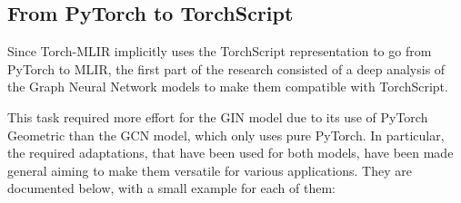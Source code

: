 \subsection{From PyTorch to TorchScript}
\label{subsec:pytorch-to-torchscript}%

Since Torch-MLIR implicitly uses the TorchScript representation to go from PyTorch to MLIR, the first part of the research consisted of a deep analysis of the Graph Neural Network models to make them compatible with TorchScript.

This task required more effort for the GIN model due to its use of PyTorch Geometric than the GCN model, which only uses pure PyTorch.
In particular, the required adaptations, that have been used for both models, have been made general aiming to make them versatile for various applications.
They are documented below, with a small example for each of them:

